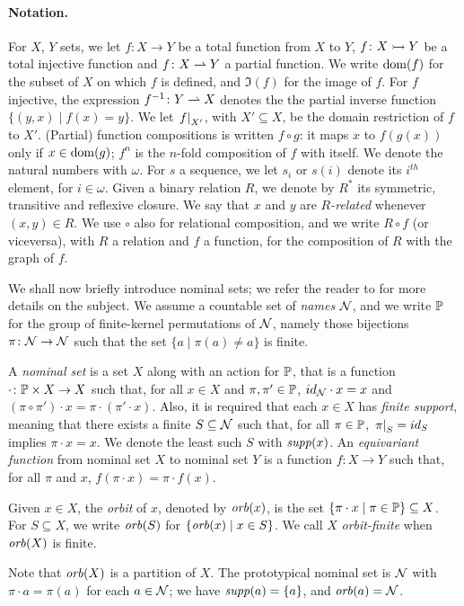 \paragraph{Notation.} For $X$, $Y$ sets, we let $f \colon X \to Y$ be a total function from $X$ to $Y$, $f \colon X \rightarrowtail Y$ be a total injective function and $f \colon X \rightharpoonup Y$ a partial function. We write $\operatorname{dom}(f)$ for the subset of $X$ on which $f$ is defined, and $\Im(f)$ for the image of $f$. For $f$ injective, the expression $f^{-1} \colon Y \rightharpoonup X$ denotes the the partial inverse function $\{(y,x) \mid f(x) = y \}$. We let $\left.f\right|_{X'}$, with $X' \subseteq X$, be the domain restriction of $f$ to $X'$. (Partial) function compositions is written $f \circ g$: it maps $x$ to $f(g(x))$ only if $x \in \operatorname{dom}(g)$; $f^n$ is the $n$-fold composition of $f$ with itself. We denote the natural numbers with $\omega$. For $s$ a sequence, we let $s_i$ or $s(i)$ denote its $i^{\mathit{th}}$ element, for $i \in \omega$. Given a binary relation $R$, we denote by $R^*$ its symmetric, transitive and reflexive closure. We say that $x$ and $y$ are \emph{$R$-related} whenever $(x,y) \in R$. We use $\circ$ also for relational composition, and we write $R \circ f$ (or viceversa), with $R$ a relation and $f$ a function, for the composition of $R$ with the graph of $f$.

We shall now briefly introduce nominal sets; we refer the reader to \cite{GP02} for more details on the subject. We assume a countable set of \emph{names} $\mathcal{N}$, and we write $\mathbb{P}$ for the group of finite-kernel permutations of $\mathcal{N}$, namely those bijections $\pi \colon \mathcal{N} \to \mathcal{N}$ such that the set $\{ a \mid \pi(a) \neq a \}$ is finite.
\begin{definition}
A \emph{nominal set} is a set $X$ along with an action for $\mathbb{P}$, that is a function $\cdot \colon \mathbb{P} \times X \to X$ such that, for all $x \in X$ and $\pi,\pi' \in \mathbb{P}$, $id_{\mathcal{N}} \cdot x = x$ and $(\pi \circ \pi') \cdot x = \pi \cdot (\pi' \cdot x)$. Also, it is required that each $x \in X$ has \emph{finite support}, meaning that there exists a finite $S \subseteq \mathcal{N}$ such that, for all $\pi \in \mathbb{P}$, $\left.\pi\right|_{S} = id_S$ implies $\pi \cdot x = x$. We denote the least such $S$ with $\mathit{supp}(x)$. An \emph{equivariant function} from nominal set $X$ to nominal set $Y$ is a function $f : X \to Y$ such that, for all $\pi$ and $x$, $f(\pi \cdot x) = \pi \cdot f(x)$.
\end{definition}
%
\begin{definition}
Given $x \in X$, the \emph{orbit} of $x$, denoted by $\mathit{orb}(x) $, is the set $\{ \pi \cdot x \mid \pi \in \mathbb{P}\} \subseteq X$. For $S \subseteq X$, we write $\mathit{orb}(S)$ for $\{ \mathit{orb}(x) \mid x \in S\}$. We call $X$ \emph{orbit-finite} when $\mathit{orb}(X)$ is finite.
\end{definition}

\noindent Note that $\mathit{orb}(X)$ is a partition of $X$. The prototypical nominal set is $\mathcal{N}$ with $\pi \cdot a = \pi(a)$ for each $a \in \mathcal{N}$; we have $\mathit{supp}(a) = \{a\}$, and $\mathit{orb}(a) = \mathcal{N}$.
